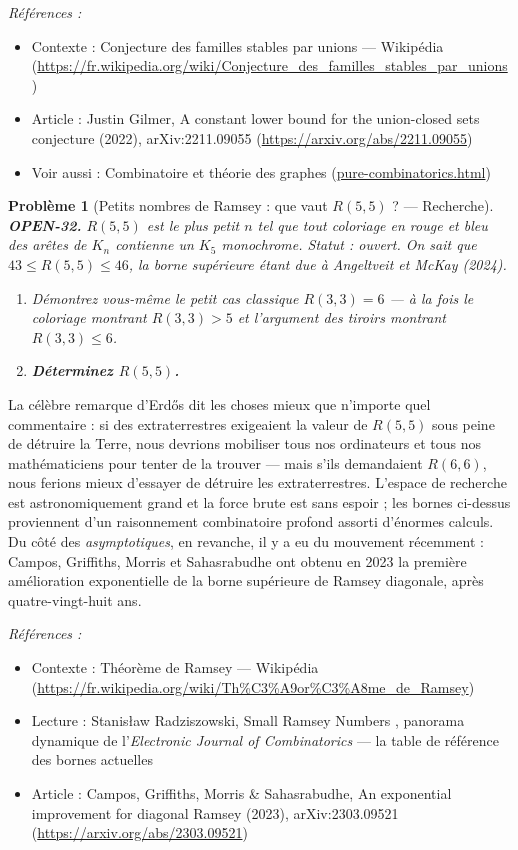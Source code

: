 \documentclass[11pt]{article}
\newtheorem{problem}{Problème}
\newenvironment{refs}{\par\small\noindent\emph{Références :}\begin{itemize}\setlength\itemsep{0pt}}{\end{itemize}\normalsize}
\begin{document}
\begin{refs}
\item Contexte : Conjecture des familles stables par unions --- Wikipédia (\url{https://fr.wikipedia.org/wiki/Conjecture_des_familles_stables_par_unions})
\item Article : Justin Gilmer, \og{} A constant lower bound for the union-closed sets conjecture \fg{} (2022), arXiv:2211.09055 (\url{https://arxiv.org/abs/2211.09055})
\item Voir aussi : Combinatoire et théorie des graphes (\url{pure-combinatorics.html})
\end{refs}

\bigskip

\begin{problem}[{Petits nombres de Ramsey : que vaut $ R(5,5) $ ? --- Recherche}]
\textbf{OPEN-32.} $ R(5,5) $ est le plus petit $ n $ tel que tout coloriage en rouge
et bleu des arêtes de $ K_n $ contienne un $ K_5 $ monochrome. Statut : ouvert. On
sait que $ 43 \leq R(5,5) \leq 46 $, la borne supérieure étant due à Angeltveit et
McKay (2024).
\begin{enumerate}
\item[(a)] Démontrez vous-même le petit cas classique $ R(3,3) = 6 $ --- à la fois le coloriage
montrant $ R(3,3) > 5 $ et l'argument des tiroirs montrant $ R(3,3) \leq 6 $.
\item[(b)] \textbf{Déterminez $ R(5,5) $.}
\end{enumerate}

\end{problem}

\noindent La célèbre remarque d'Erd\H{o}s dit les choses mieux que n'importe quel
commentaire : si des extraterrestres exigeaient la valeur de $ R(5,5) $ sous peine de
détruire la Terre, nous devrions mobiliser tous nos ordinateurs et tous nos mathématiciens
pour tenter de la trouver --- mais s'ils demandaient $ R(6,6) $, nous ferions mieux
d'essayer de détruire les extraterrestres. L'espace de recherche est astronomiquement
grand et la force brute est sans espoir ; les bornes ci-dessus proviennent d'un
raisonnement combinatoire profond assorti d'énormes calculs. Du côté des
\textit{asymptotiques}, en revanche, il y a eu du mouvement récemment : Campos, Griffiths,
Morris et Sahasrabudhe ont obtenu en 2023 la première amélioration exponentielle de la
borne supérieure de Ramsey diagonale, après quatre-vingt-huit ans.

\begin{refs}
\item Contexte : Théorème de Ramsey --- Wikipédia (\url{https://fr.wikipedia.org/wiki/Th%C3%A9or%C3%A8me_de_Ramsey})
\item Lecture : Stanis\l{}aw Radziszowski, \og{} Small Ramsey Numbers \fg{}, panorama dynamique de l'\textit{Electronic Journal of Combinatorics} --- la table de référence des bornes actuelles
\item Article : Campos, Griffiths, Morris \& Sahasrabudhe, \og{} An exponential improvement for diagonal Ramsey \fg{} (2023), arXiv:2303.09521 (\url{https://arxiv.org/abs/2303.09521})
\end{refs}
\end{document}
